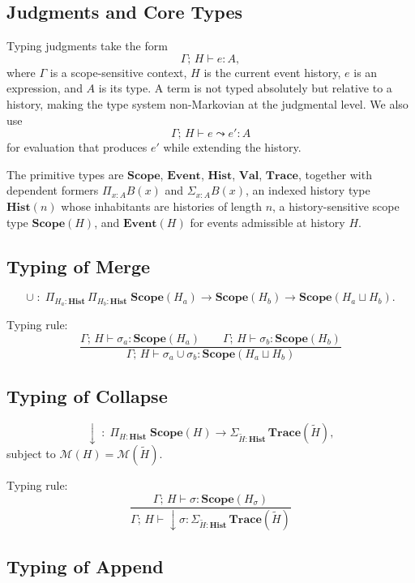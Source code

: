 \documentclass[11pt,a4paper]{article}
\theoremstyle{definition}
\theoremstyle{remark}
\begin{document}
\subsection{Judgments and Core Types}

Typing judgments take the form
\[
\Gamma;\, H \vdash e : A,
\]
where $\Gamma$ is a scope-sensitive context, $H$ is the current event history, $e$ is an expression, and $A$ is its type. A term is not typed absolutely but relative to a history, making the type system non-Markovian at the judgmental level. We also use
\[
\Gamma;\, H \vdash e \leadsto e' : A
\]
for evaluation that produces $e'$ while extending the history.

The primitive types are $\mathbf{Scope}$, $\mathbf{Event}$, $\mathbf{Hist}$, $\mathbf{Val}$, $\mathbf{Trace}$, together with dependent formers $\Pi_{x:A} B(x)$ and $\Sigma_{x:A} B(x)$, an indexed history type $\mathbf{Hist}(n)$ whose inhabitants are histories of length $n$, a history-sensitive scope type $\mathbf{Scope}(H)$, and $\mathbf{Event}(H)$ for events admissible at history $H$.

\subsection{Typing of Merge}

\[
\cup\; :\; \Pi_{H_a : \mathbf{Hist}}\, \Pi_{H_b : \mathbf{Hist}}\; \mathbf{Scope}(H_a) \to \mathbf{Scope}(H_b) \to \mathbf{Scope}(H_a \sqcup H_b).
\]

Typing rule:
\[
\frac{
\Gamma;\, H \vdash \sigma_a : \mathbf{Scope}(H_a) \qquad \Gamma;\, H \vdash \sigma_b : \mathbf{Scope}(H_b)
}{
\Gamma;\, H \vdash \sigma_a \cup \sigma_b : \mathbf{Scope}(H_a \sqcup H_b)
}
\]

\subsection{Typing of Collapse}

\[
\downarrow\; :\; \Pi_{H : \mathbf{Hist}}\; \mathbf{Scope}(H) \to \Sigma_{\tilde H : \mathbf{Hist}}\, \mathbf{Trace}(\tilde H),
\]
subject to $\mathcal{M}(H) = \mathcal{M}(\tilde H)$.

Typing rule:
\[
\frac{
\Gamma;\, H \vdash \sigma : \mathbf{Scope}(H_\sigma)
}{
\Gamma;\, H \vdash \downarrow \sigma : \Sigma_{\tilde H : \mathbf{Hist}}\, \mathbf{Trace}(\tilde H)
}
\]

\subsection{Typing of Append}
\end{document}
